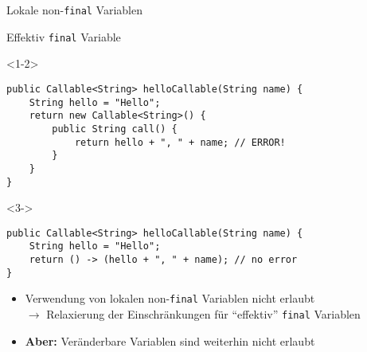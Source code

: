 \begin{frame}[fragile]{Lokale non-\texttt{final} Variablen}
    \begin{center}
        \begin{minipage}[b]{0.75\textwidth}
            \begin{block}{Effektiv \texttt{final} Variable \citep{goetz13}}                
                \begin{onlyenv}<1-2>
                    \begin{lstlisting}
public Callable<String> helloCallable(String name) {
    String hello = "Hello";
    return new Callable<String>() {
        public String call() {
            return hello + ", " + name; // ERROR!
        }
    }
}
                    \end{lstlisting}                    
                \end{onlyenv}                    
                \begin{onlyenv}<3->
                    \begin{lstlisting}
public Callable<String> helloCallable(String name) {
    String hello = "Hello";
    return () -> (hello + ", " + name); // no error
}
                    \end{lstlisting}                    
                \end{onlyenv}
            \end{block}
        \end{minipage}
    \end{center}   

    \begin{itemize}
        \item<2-> Verwendung von lokalen non-\texttt{final} Variablen nicht erlaubt   
        \pause
        \textcolor<3>{dkred!70}{ \\$\rightarrow$ Relaxierung der Einschränkungen für \enquote{effektiv} \texttt{final} Variablen}
        \item<4-> \textbf{Aber:} Veränderbare Variablen sind weiterhin nicht erlaubt
    \end{itemize}

\end{frame}

